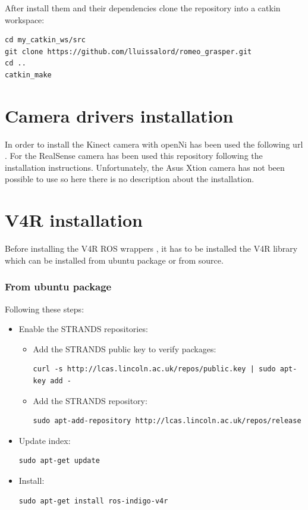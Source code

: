 \documentclass[12pt,a4paper,final,twoside,openright]{report}
\begin{document}
After install them and their dependencies clone the repository into a catkin workspace:

\begin{lstlisting}[language=Git]
cd my_catkin_ws/src
git clone https://github.com/lluissalord/romeo_grasper.git
cd ..
catkin_make
\end{lstlisting}

\section{Camera drivers installation}
\label{app:camera_instal}

In order to install the Kinect camera with openNi has been used the following url \cite{Li}. For the RealSense camera has been used this repository \cite{gitRealSense} following the installation instructions. Unfortunately, the Asus Xtion camera has not been possible to use so here there is no description about the installation.

\section{V4R installation}

Before installing the V4R ROS wrappers \cite{gitV4RWrappers}, it has to be installed the V4R library \cite{gitV4R} which can be installed from ubuntu package or from source.

\subsubsection{From ubuntu package}
	
Following these steps:

\begin{itemize}
\item Enable the STRANDS repositories:
\begin{itemize}
\item Add the STRANDS public key to verify packages: 
\begin{lstlisting}[language=Git]
curl -s http://lcas.lincoln.ac.uk/repos/public.key | sudo apt-key add -
\end{lstlisting}
\item Add the STRANDS repository:  
\begin{lstlisting}[language=Git]
sudo apt-add-repository http://lcas.lincoln.ac.uk/repos/release
\end{lstlisting}
\end{itemize}
\item Update index:
\begin{lstlisting}[language=Git]
sudo apt-get update
\end{lstlisting}
\item Install:
\begin{lstlisting}[language=Git]
sudo apt-get install ros-indigo-v4r
\end{lstlisting}
\end{itemize}
\end{document}
